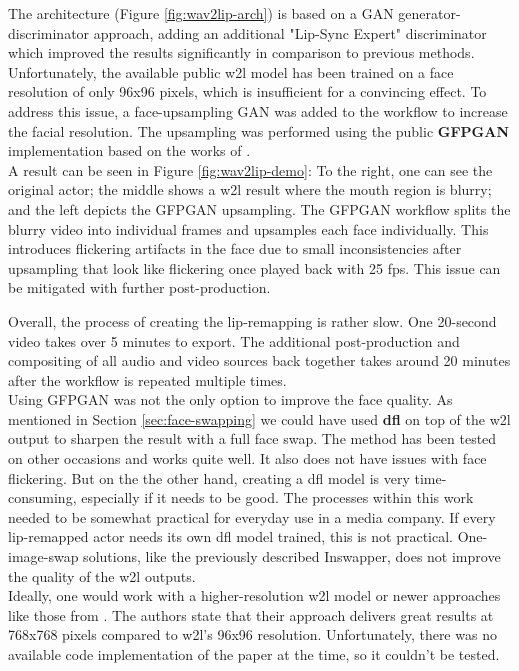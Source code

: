 \documentclass[
  a4paper,  %
  twoside,  %
  bibliography=totoc,
  headsepline,
  cleardoublepage=empty,
  parskip=half,
  draft=false
]{scrbook}
\begin{document}
The architecture (Figure \ref{fig:wav2lip-arch}) is based on a GAN generator-discriminator approach, adding an additional "Lip-Sync Expert" discriminator which improved the results significantly in comparison to previous methods. \\
Unfortunately, the available public \gls{w2l} model has been trained on a face resolution of only 96x96 pixels, which is insufficient for a convincing effect. To address this issue, a face-upsampling GAN was added to the workflow to increase the facial resolution. The upsampling was performed using the public \textbf{GFPGAN} implementation based on the works of \citet{wangNeuralSourcefilterbasedWaveform2019}. \\
A result can be seen in Figure \ref{fig:wav2lip-demo}: To the right, one can see the original actor; the middle shows a \gls{w2l} result where the mouth region is blurry; and the left depicts the GFPGAN upsampling. The GFPGAN workflow splits the blurry video into individual frames and upsamples each face individually. This introduces flickering artifacts in the face due to small inconsistencies after upsampling that look like flickering once played back with 25 \gls{fps}. This issue can be mitigated with further post-production.

Overall, the process of creating the lip-remapping is rather slow. One 20-second video takes over 5 minutes to export. The additional post-production and compositing of all audio and video sources back together takes around 20 minutes after the workflow is repeated multiple times. \\
Using GFPGAN was not the only option to improve the face quality. As mentioned in Section \ref{sec:face-swapping} we could have used \textbf{\gls{dfl}} on top of the \gls{w2l} output to sharpen the result with a full face swap. The method has been tested on other occasions and works quite well. It also does not have issues with face flickering. But on the the other hand, creating a \gls{dfl} model is very time-consuming, especially if it needs to be good. The processes within this work needed to be somewhat practical for everyday use in a media company. If every lip-remapped actor needs its own \gls{dfl} model trained, this is not practical. One-image-swap solutions, like the previously described Inswapper, does not improve the quality of the \gls{w2l} outputs. \\
Ideally, one would work with a higher-resolution \gls{w2l} model or newer approaches like those from \citet{guptaGeneratingUltraHighResolution2023}. The authors state that their approach delivers great results at 768x768 pixels compared to \gls{w2l}'s 96x96 resolution. Unfortunately, there was no available code implementation of the paper at the time, so it couldn't be tested.
\end{document}
